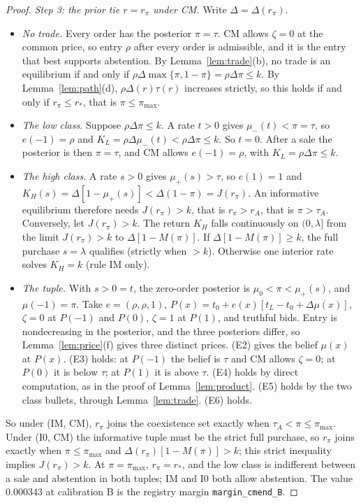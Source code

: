 \documentclass[11pt]{article}
\theoremstyle{definition}
\begin{document}
\begin{proof}
\emph{Step 3: the prior tie $r=r_\pi$ under CM.} Write $\Delta=\Delta(r_\pi)$.
\begin{itemize}
\item \emph{No trade.} Every order has the posterior $\pi=\tau$. CM allows $\zeta=0$ at the common price, so entry
  $\rho$ after every order is admissible, and it is the entry that best supports abstention. By
  Lemma~\ref{lem:trade}(b), no trade is an equilibrium if and only if $\rho\Delta\max\{\pi,1-\pi\}=\rho\Delta\pi\le k$.
  By Lemma~\ref{lem:path}(d), $\rho\Delta(r)\tau(r)$ increases strictly, so this holds if and only if $r_\pi\le r_*$,
  that is $\pi\le\pi_{\max}$.
\item \emph{The low class.} Suppose $\rho\Delta\pi\le k$. A rate $t>0$ gives $\mu_-(t)<\pi=\tau$, so $e(-1)=\rho$ and
  $K_L=\rho\Delta\mu_-(t)<\rho\Delta\pi\le k$. So $t=0$. After a sale the posterior is then $\pi=\tau$, and CM allows
  $e(-1)=\rho$, with $K_L=\rho\Delta\pi\le k$.
\item \emph{The high class.} A rate $s>0$ gives $\mu_+(s)>\tau$, so $e(1)=1$ and
  $K_H(s)=\Delta[1-\mu_+(s)]<\Delta(1-\pi)=J(r_\pi)$. An informative equilibrium therefore needs $J(r_\pi)>k$, that is
  $r_\pi>r_A$, that is $\pi>\tau_A$. Conversely, let $J(r_\pi)>k$. The return $K_H$ falls continuously on $(0,\lambda]$
  from the limit $J(r_\pi)>k$ to $\Delta[1-M(\pi)]$. If $\Delta[1-M(\pi)]\ge k$, the full purchase $s=\lambda$
  qualifies (strictly when $>k$). Otherwise one interior rate solves $K_H=k$ (rule IM only).
\item \emph{The tuple.} With $s>0=t$, the zero-order posterior is $\mu_0<\pi<\mu_+(s)$, and $\mu(-1)=\pi$. Take
  $e=(\rho,\rho,1)$, $P(x)=t_0+e(x)[t_L-t_0+\Delta\mu(x)]$, $\zeta=0$ at $P(-1)$ and $P(0)$, $\zeta=1$ at $P(1)$, and
  truthful bids. Entry is nondecreasing in the posterior, and the three posteriors differ, so
  Lemma~\ref{lem:price}(f) gives three distinct prices. (E2) gives the belief $\mu(x)$ at $P(x)$. (E3) holds: at
  $P(-1)$ the belief is $\tau$ and CM allows $\zeta=0$; at $P(0)$ it is below $\tau$; at $P(1)$ it is above $\tau$.
  (E4) holds by direct computation, as in the proof of Lemma~\ref{lem:product}. (E5) holds by the two class bullets,
  through Lemma~\ref{lem:trade}. (E6) holds.
\end{itemize}
So under (IM, CM), $r_\pi$ joins the coexistence set exactly when $\tau_A<\pi\le\pi_{\max}$. Under (I0, CM) the
informative tuple must be the strict full purchase, so $r_\pi$ joins exactly when $\pi\le\pi_{\max}$ and
$\Delta(r_\pi)[1-M(\pi)]>k$; this strict inequality implies $J(r_\pi)>k$. At $\pi=\pi_{\max}$, $r_\pi=r_*$, and the
low class is indifferent between a sale and abstention in both tuples; IM and I0 both allow abstention. The value
$0.000343$ at calibration B is the registry margin \texttt{margin\_cmend\_B}.
\end{proof}
\end{document}
